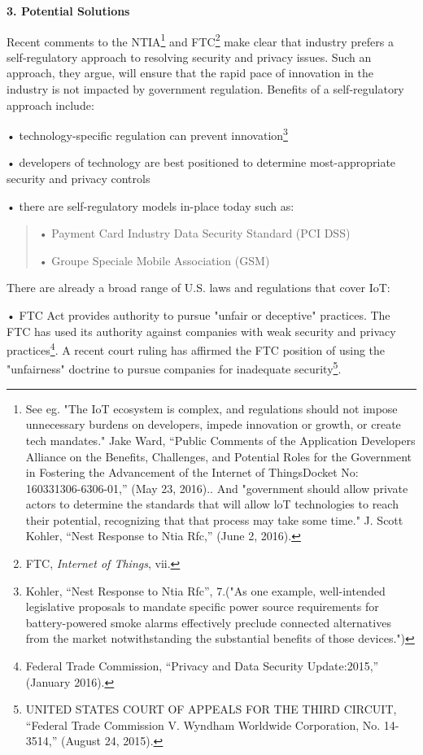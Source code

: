 \textbf{3. Potential Solutions}

Recent comments to the NTIA\footnote{See eg. "The IoT ecosystem is
  complex, and regulations should not impose unnecessary burdens on
  developers, impede innovation or growth, or create tech mandates."
  Jake Ward, ``Public Comments of the Application Developers Alliance on
  the Benefits, Challenges, and Potential Roles for the Government in
  Fostering the Advancement of the Internet of ThingsDocket No:
  160331306-6306-01,'' (May 23, 2016).. And "government should allow
  private actors to determine the standards that will allow loT
  technologies to reach their potential, recognizing that that process
  may take some time." J. Scott Kohler, ``Nest Response to Ntia Rfc,''
  (June 2, 2016).} and FTC\footnote{FTC, \emph{Internet of Things}, vii.}
make clear that industry prefers a self-regulatory approach to resolving
security and privacy issues. Such an approach, they argue, will ensure
that the rapid pace of innovation in the industry is not impacted by
government regulation. Benefits of a self-regulatory approach include:

• technology-specific regulation can prevent innovation\footnote{Kohler,
  ``Nest Response to Ntia Rfc'', 7.("As one example, well-intended
  legislative proposals to mandate specific power source requirements
  for battery-powered smoke alarms effectively preclude connected
  alternatives from the market notwithstanding the substantial benefits
  of those devices.")}

• developers of technology are best positioned to determine
most-appropriate security and privacy controls

• there are self-regulatory models in-place today such as:

\begin{quote}
• Payment Card Industry Data Security Standard (PCI DSS)

• Groupe Speciale Mobile Association (GSM)
\end{quote}

There are already a broad range of U.S. laws and regulations that cover
IoT:

• FTC Act provides authority to pursue "unfair or deceptive" practices.
The FTC has used its authority against companies with weak security and
privacy practices\footnote{Federal Trade Commission, ``Privacy and Data
  Security Update:2015,'' (January 2016).}. A recent court ruling has
affirmed the FTC position of using the "unfairness" doctrine to pursue
companies for inadequate security\footnote{UNITED STATES COURT OF
  APPEALS FOR THE THIRD CIRCUIT, ``Federal Trade Commission V. Wyndham
  Worldwide Corporation, No. 14-3514,'' (August 24, 2015).}.


